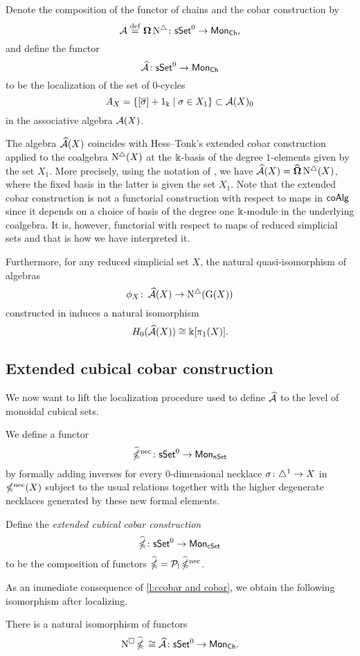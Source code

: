 Denote the composition of the functor of chains and the cobar construction by
\[
\operatorname{\mathcal{A}} \stackrel{\mathrm{def}}{=} \operatorname{\mathbf{\Omega}} \operatorname{N^{\triangle}} \colon \mathsf{sSet}^0 \to \mathsf{Mon}_{\mathsf{Ch}},
\]
and define the functor
\[
\operatorname{\mathcal{\widehat{A}}} \colon \mathsf{sSet}^0 \to \mathsf{Mon}_{\mathsf{Ch}}
\]
to be the localization of the set of $0$-cycles
\[
A_X = \{ [\overline{\sigma}]+1_\Bbbk \mid \sigma \in X_1 \} \subset \operatorname{\mathcal{A}}(X)_0
\]
in the associative algebra $\operatorname{\mathcal{A}}(X)$.

The algebra $\operatorname{\mathcal{\widehat{A}}}(X)$ coincides with Hess--Tonk's extended cobar construction applied to the coalgebra $\operatorname{N^{\triangle}}(X)$ at the $\Bbbk$-basis of the degree $1$-elements given by the set $X_1$.
More precisely, using the notation of \cite{hess2010cobar}, we have $\operatorname{\mathcal{\widehat{A}}}(X) = \widehat{\operatorname{\mathbf{\Omega}}} \operatorname{N^{\triangle}}(X)$, where the fixed basis in the latter is given the set $X_1$.
Note that the extended cobar construction is not a functorial construction with respect to maps in $\mathsf{coAlg}$ since it depends on a choice of basis of the degree one $\Bbbk$-module in the underlying coalgebra.
It is, however, functorial with respect to maps of reduced simplicial sets and that is how we have interpreted it.

Furthermore, for any reduced simplicial set $X$, the natural quasi-isomorphism of algebras
\[
\phi_X \colon \operatorname{\mathcal{\widehat{A}}}(X) \to \operatorname{N^{\triangle}}(\operatorname{G}(X))
\]
constructed in \cite{hess2010cobar} induces a natural isomorphism
\[
H_0(\operatorname{\mathcal{\widehat{A}}}(X)) \cong \Bbbk[\pi_1(X)].
\]

\subsection{Extended cubical cobar construction} \label{ss:extended cubical cobar}

We now want to lift the localization procedure used to define $\operatorname{\mathcal{\widehat{A}}}$ to the level of monoidal cubical sets.

We define a functor
\[
\operatorname{\widehat{\mathbb{\Omega}}^{\mathrm{nec}}} \colon \mathsf{sSet}^0 \to \mathsf{Mon}_{\mathsf{nSet}}
\]
by formally adding inverses for every $0$-dimensional necklace $\sigma \colon \triangle^1 \to X$ in $\operatorname{\mathbb{\Omega}^{\mathrm{nec}}}(X)$ subject to the usual relations together with the higher degenerate necklaces generated by these new formal elements.

Define the \textit{extended cubical cobar construction}
\[
\operatorname{\widehat{\mathbb{\Omega}}} \colon \mathsf{sSet}^0 \to \mathsf{Mon}_{\mathsf{cSet}}
\]
to be the composition of functors $\operatorname{\widehat{\mathbb{\Omega}}} = \mathcal{P}_{!} \operatorname{\widehat{\mathbb{\Omega}}^{\mathrm{nec}}}$.

As an immediate consequence of \cref{l:ccobar and cobar}, we obtain the following isomorphism after localizing.

\begin{corollary}
	There is a natural isomorphism of functors
	\[
	\operatorname{N^{\square}} \operatorname{\widehat{\mathbb{\Omega}}} \, \cong \operatorname{\mathcal{\widehat{A}}} \colon \mathsf{sSet}^0 \to \mathsf{Mon}_{\mathsf{Ch}}.
	\]
\end{corollary}

